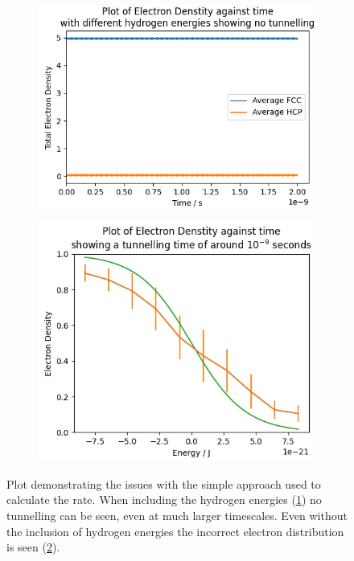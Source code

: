 \begin{figure}[htbp]
    \captionsetup[subfigure]{justification=centering}
    \centering
    \begin{subfigure}{0.45\linewidth}
        \includegraphics[width=0.9\linewidth]{Figures/Simulation/Plot of large band simulation with hydrogen energies.png}
        \label{fig:large band non degenerate simulation}
    \end{subfigure}
    \begin{subfigure}{0.45\linewidth}
        \includegraphics[width=0.9\linewidth]{Figures/Simulation/Plot of large band electron distribution.png}
        \label{fig:large band fermi-dirac}
    \end{subfigure}
    \caption{Plot demonstrating the issues with the
        simple approach used to calculate the rate.
        When including the hydrogen energies
        (\cref{fig:large band non degenerate simulation})
        no tunnelling can be seen, even
        at much larger timescales. Even without the
        inclusion of hydrogen energies
        the incorrect electron distribution is
        seen (\cref{fig:large band fermi-dirac}).
    }\label{fig:issues with single large band}
\end{figure}

